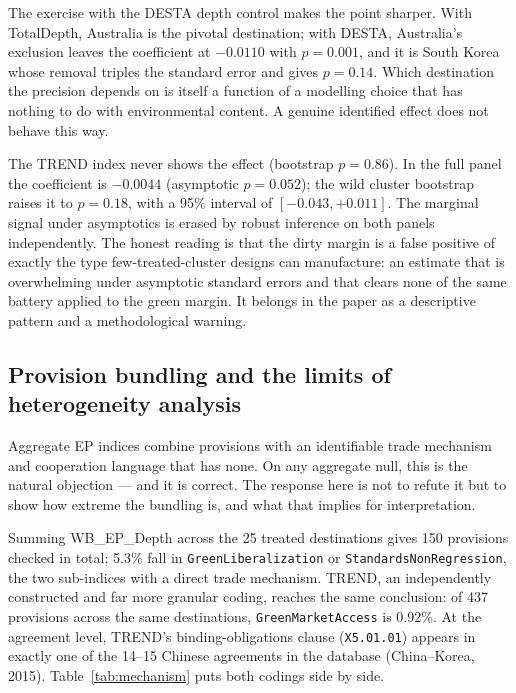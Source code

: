 \documentclass[12pt]{article}
\begin{document}
The exercise with the DESTA depth control makes the point sharper. With TotalDepth,
Australia is the pivotal destination; with DESTA, Australia's exclusion leaves the
coefficient at $-0.0110$ with $p = 0.001$, and it is South Korea whose removal triples
the standard error and gives $p = 0.14$. Which destination the precision depends on is
itself a function of a modelling choice that has nothing to do with environmental
content. A genuine identified effect does not behave this way.

The TREND index never shows the effect (bootstrap $p = 0.86$). In the full panel the
coefficient is $-0.0044$ (asymptotic $p = 0.052$); the wild cluster bootstrap raises it
to $p = 0.18$, with a 95\% interval of $[-0.043, +0.011]$. The marginal signal under
asymptotics is erased by robust inference on both panels independently. The honest
reading is that the dirty margin is a false positive of exactly the type few-treated-cluster
designs can manufacture: an estimate that is overwhelming under asymptotic standard errors
and that clears none of the same battery applied to the green margin. It belongs in the
paper as a descriptive pattern and a methodological warning.

\subsection{Provision bundling and the limits of heterogeneity analysis}\label{sec:bundling}

Aggregate EP indices combine provisions with an identifiable trade mechanism and
cooperation language that has none. On any aggregate null, this is the natural objection
--- and it is correct. The response here is not to refute it but to show how extreme the
bundling is, and what that implies for interpretation.

Summing WB\_EP\_Depth across the 25 treated destinations gives 150 provisions checked in
total; 5.3\% fall in \texttt{GreenLiberalization} or \texttt{StandardsNonRegression},
the two sub-indices with a direct trade mechanism. TREND, an independently constructed
and far more granular coding, reaches the same conclusion: of 437 provisions across the
same destinations, \texttt{GreenMarketAccess} is 0.92\%. At the agreement level, TREND's
binding-obligations clause (\texttt{X5.01.01}) appears in exactly one of the 14--15
Chinese agreements in the database (China--Korea, 2015). Table~\ref{tab:mechanism} puts
both codings side by side.
\end{document}
